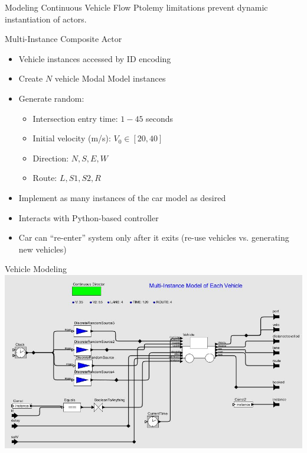 \begin{frame}{Modeling Continuous Vehicle Flow}
Ptolemy limitations prevent dynamic instantiation of actors.
\begin{block}{Multi-Instance Composite Actor}
\begin{minipage}{0.45\linewidth}
\begin{itemize}
\item Vehicle instances accessed by ID encoding
\item Create $N$ vehicle Modal Model instances
\item Generate random:
	\begin{itemize}
	\item Intersection entry time: $1-45$ seconds
	\item Initial velocity (m/s): $V_0 \in [20,40]$
	\item Direction: $N,S,E,W$
	\item Route: $L,S1,S2,R$
	\end{itemize}
\end{itemize}
\end{minipage}
\hfill
\begin{minipage}{0.45\linewidth}
\begin{itemize}
\item Implement as many instances of the car model as desired
\item Interacts with Python-based controller
\item Car can ``re-enter'' system only after it exits (re-use vehicles 
	vs. generating new vehicles)
\end{itemize}
\end{minipage}
\end{block}
\end{frame}

\begin{frame}{Vehicle Modeling}
\centering\includegraphics[width=0.9\linewidth]{diagram/ptolemy_multiinstance_actor.jpg}
\end{frame}

